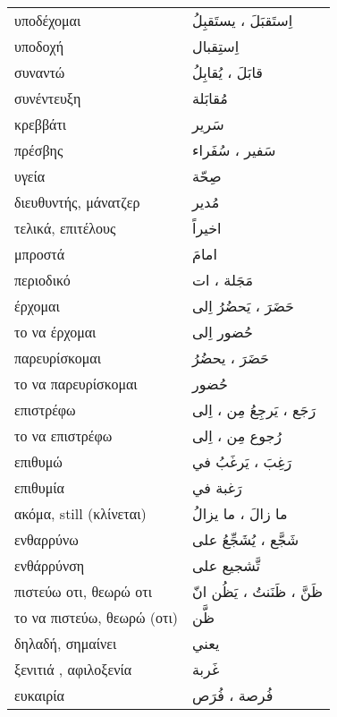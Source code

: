 \documentclass[twocolumn,a4paper]{article}
\newcommand{\ar}[1]{\textarabic{#1}}
\newcommand{\pl}{\raisebox{0.15ex}{\footnotesize ◍}}
\newcommand{\normpl}[1]{\ar{ #1، ات }}
\newcommand{\vrf}{\raisebox{0.15ex}{\footnotesize ◉}}
\newcommand{\mas}{\raisebox{0.15ex}{\footnotesize ◫}}
\begin{document}
\begin{mpsupertabular}{ P{0.5\textwidth} P{0.5\textwidth} }
υποδέχομαι \vrf              & \ar{ اِستَقبَلَ ، يستَقبِلُ } \\
υποδοχή \mas                 & \ar{ اِستِقبال } \\
συναντώ \vrf                 & \ar{ قابَلَ ، يُقابِلُ } \\
συνέντευξη \mas              & \ar{ مُقابَلة } \\
κρεββάτι                     & \ar{ سَرير } \\
πρέσβης \pl                  & \ar{ سَفير ، سُفَراء } \\
υγεία                        & \ar{ صِحّة } \\
διευθυντής, μάνατζερ         & \ar{ مُدير } \\

τελικά, επιτέλους            & \ar{ اخيراً } \\
μπροστά                      & \ar{ امامَ } \\
περιοδικό \pl                & \normpl{ مَجَلة } \\
έρχομαι \vrf                 & \ar{ حَضَرَ ، يَحضُرُ اِلى } \\
το να έρχομαι \mas           & \ar{ حُضور اِلى } \\
παρευρίσκομαι \vrf           & \ar{ حَضَرَ ، يحضُرُ } \\
το να παρευρίσκομαι \mas     & \ar{ حُضور } \\
επιστρέφω \vrf               & \ar{ رَجَع ، يَرجِعُ مِن ، اِلى } \\
το να επιστρέφω \mas         & \ar{ رُجوع مِن ، اِلى } \\
επιθυμώ \vrf                 & \ar{ رَغِبَ ، يَرغَبُ في } \\
επιθυμία \mas                & \ar{ رَغبة في } \\
ακόμα, still (κλίνεται)      & \ar{ ما زالَ ، ما يزالُ } \\ %
ενθαρρύνω \vrf               & \ar{ شَجَّع ، يُشَجِّعُ على } \\
ενθάρρύνση \mas              & \ar{ تَّشجيع على } \\
πιστεύω οτι, θεωρώ οτι \vrf  & \ar{ ظَنَّ ، ظَنَنتُ ، يَظُن انّ } \\
το να πιστεύω, θεωρώ (οτι) \mas    & \ar{ ظَّن } \\
δηλαδή, σημαίνει             & \ar{ يعني } \\
ξενιτιά , αφιλοξενία         & \ar{ غَربة } \\
ευκαιρία \pl                 & \ar{ فُرصة ، فُرَص } \\

\end{mpsupertabular}
\end{document}
